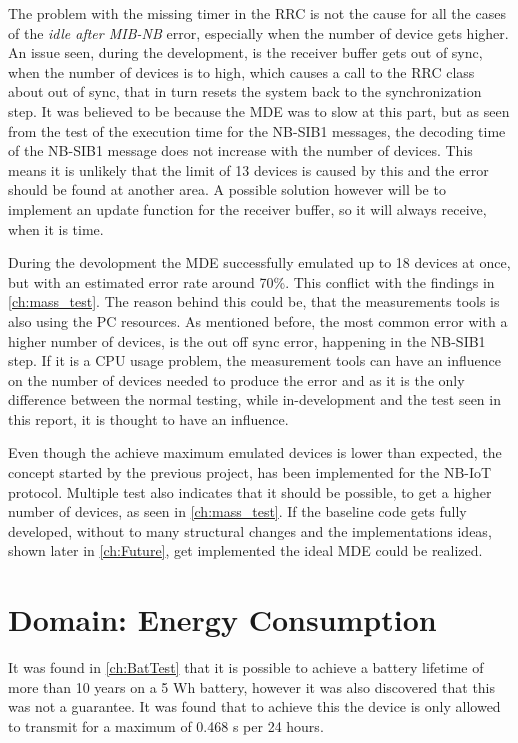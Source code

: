 The problem with the missing timer in the RRC is not the cause for all the cases of the \textit{idle after MIB-NB} error, especially when the number of device gets higher. An issue seen, during the development, is the receiver buffer gets out of sync, when the number of devices is to high, which causes a call to the RRC class about out of sync, that in turn resets the system back to the synchronization step. It was believed to be because the MDE was to slow at this part, but as seen from the test of the execution time for the NB-SIB1 messages, the decoding time of the NB-SIB1 message does not increase with the  number of devices. This means it is unlikely that the limit of 13 devices is caused by this and the error should be found at another area. A possible solution however will be to implement an update function for the receiver buffer, so it will always receive, when it is time.

During the devolopment the MDE successfully emulated up to 18 devices at once, but with an estimated error rate around 70\%. This conflict with the findings in \autoref{ch:mass_test}. The reason behind this could be, that the measurements tools is also using the PC resources. As mentioned before, the most common error with a higher number of devices, is the out off sync error, happening in the NB-SIB1 step. If it is a CPU usage problem, the measurement tools can have an influence on the number of devices needed to produce the error and as it is the only difference between the normal testing, while in-development and the test seen in this report, it is thought to have an influence.

Even though the achieve maximum emulated devices is lower than expected, the concept started by the previous project, has been implemented for the NB-IoT protocol. Multiple test also indicates that it should be possible, to get a higher number of devices, as seen in \autoref{ch:mass_test}. If the baseline code gets fully developed, without to many structural changes and the implementations ideas, shown later in \autoref{ch:Future}, get implemented the ideal MDE could be realized. 



\section{Domain: Energy Consumption}
It was found in \autoref{ch:BatTest} that it is possible to achieve a battery lifetime of more than 10 years on a 5 Wh battery, however it was also discovered that this was not a guarantee. It was found that to achieve this the device is only allowed to transmit for a maximum of 0.468 s per 24 hours. 

